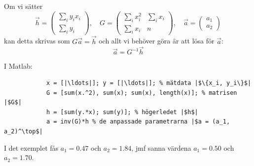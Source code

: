 \documentclass[9pt]{beamer}
\begin{document}
    \begin{frame}[fragile]
        Om vi sätter
        \begin{equation*}
            \vec h =
            \begin{pmatrix}
                \sum_i y_ix_i \\
                \sum_i y_i
            \end{pmatrix},\quad
            G =
            \begin{pmatrix}
                \sum_i x_i^2 & \sum_ix_i \\
                \sum_i x_i & n
            \end{pmatrix},\quad
            \vec a =
            \begin{pmatrix}
                a_1 \\
                a_2
            \end{pmatrix}
        \end{equation*}
        kan detta skrivas som $G\vec a = \vec h$ och allt vi behöver göra är att lösa för $\vec a$:
        \begin{equation*}
            \vec a = G^{-1}\vec h
        \end{equation*}

        I Matlab:
        \begin{verbatim}
            x = [|\ldots|]; y = [|\ldots|]; % mätdata |$\{x_i, y_i\}$|
            G = [sum(x.^2), sum(x); sum(x), length(x)]; % matrisen |$G$|
            h = [sum(y.*x); sum(y)]; % högerledet |$h$|
            a = inv(G)*h % de anpassade parametrarna |$a = (a_1, a_2)^\top$|
        \end{verbatim}

        \vfill
        I det exemplet fås $a_1 = 0.47$ och $a_2 = 1.84$, jmf sanna värdena $a_1 = 0.50$ och $a_2 = 1.70$.
    \end{frame}
\end{document}
